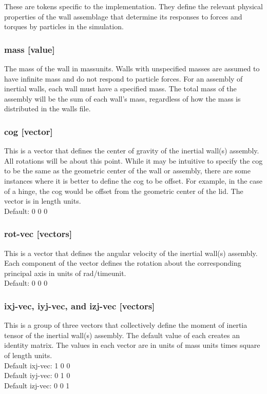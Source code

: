 These are tokens specific to the 
implementation.  They define the relevant physical properties of the
wall assemblage that determine its responses to forces and torques by
particles in the simulation.

\subsubsection{mass [value]}

The mass of the wall in massunits.  Walls with unspecified masses are
assumed to have infinite mass and do not respond to particle forces.
For an assembly of inertial walls, each wall must have a specified
mass.  The total mass of the assembly will be the sum of each wall's
mass, regardless of how the mass is distributed in the walls file.

\subsubsection{cog [vector]}

This is a vector that defines the center of gravity of the inertial
wall(s) assembly.  All rotations will be about this point. While it
may be intuitive to specify the cog to be the same as the geometric
center of the wall or assembly, there are some instances where it is
better to define the cog to be offset.  For example, in the case of a
hinge, the cog would be offset from the geometric center of the lid.
The vector is in length units.\\
Default: 0 0 0

\subsubsection{rot-vec [vectors]}

This is a vector that defines the angular velocity of the inertial
wall(s) assembly.  Each component of the vector defines the rotation
about the corresponding principal axis in units of rad/timeunit.\\
Default: 0 0 0

\subsubsection{ixj-vec, iyj-vec, and izj-vec [vectors]}

This is a group of three vectors that collectively define the moment
of inertia tensor of the inertial wall(s) assembly.  The default value
of each creates an identity matrix.  The values in each vector are in
units of mass units times square of length units.\\
Default ixj-vec: 1 0 0\\ 
Default iyj-vec: 0 1 0\\
Default izj-vec: 0 0 1

